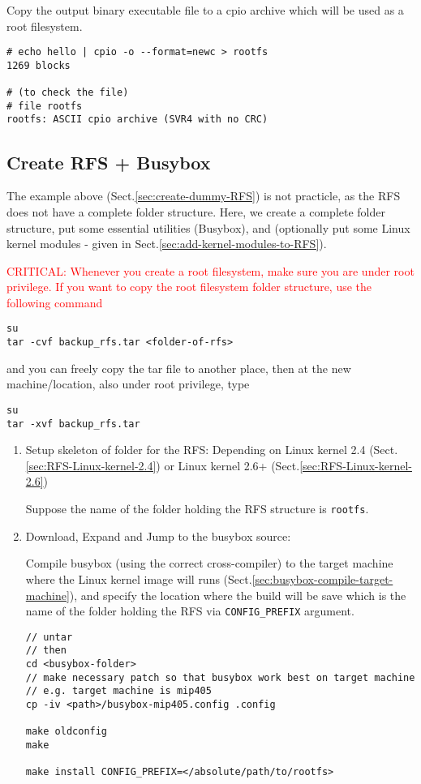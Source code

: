 Copy the output binary executable file to a cpio archive which will be
used as a root filesystem.
\begin{verbatim}
# echo hello | cpio -o --format=newc > rootfs
1269 blocks

# (to check the file)
# file rootfs
rootfs: ASCII cpio archive (SVR4 with no CRC)
\end{verbatim}

\subsection{Create RFS + Busybox}
\label{sec:create-RFS-BusyBox}

The example above (Sect.\ref{sec:create-dummy-RFS}) is not practicle, as the
RFS does not have a complete folder structure.
Here, we create a complete folder structure, put some essential utilities
(Busybox), and (optionally put some Linux kernel modules - given in
Sect.\ref{sec:add-kernel-modules-to-RFS}).

\textcolor{red}{CRITICAL: Whenever you create a root filesystem, make sure
you are under root privilege. If you want to copy the root filesystem folder
structure, use the following command}
\begin{verbatim}
su
tar -cvf backup_rfs.tar <folder-of-rfs>
\end{verbatim}
and you can freely copy the tar file to another place, then at the new
machine/location, also under root privilege, type
\begin{verbatim}
su
tar -xvf backup_rfs.tar
\end{verbatim}


\begin{enumerate}
  
  \item Setup skeleton of folder for the RFS: Depending on Linux kernel 2.4
  (Sect.\ref{sec:RFS-Linux-kernel-2.4}) or Linux kernel 2.6+
  (Sect.\ref{sec:RFS-Linux-kernel-2.6})
    
Suppose the name of the folder holding the RFS structure is \verb!rootfs!.
    
  \item Download, Expand and Jump to the busybox source:

  Compile busybox (using the correct cross-compiler) to the target machine
  where the Linux kernel image 
  will runs (Sect.\ref{sec:busybox-compile-target-machine}), 
  and specify the location where the build will be save which is
  the name of the folder holding the RFS via 
  \verb!CONFIG_PREFIX! argument. 
\begin{verbatim}
// untar 
// then
cd <busybox-folder> 
// make necessary patch so that busybox work best on target machine
// e.g. target machine is mip405
cp -iv <path>/busybox-mip405.config .config

make oldconfig
make

make install CONFIG_PREFIX=</absolute/path/to/rootfs>
\end{verbatim}
\end{enumerate}  

